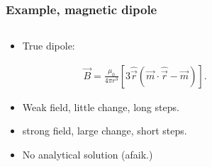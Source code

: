 \documentclass{beamer}
\begin{document}
\begin{frame}
\frametitle{Example, magnetic dipole}

\begin{columns}
\begin{column}{0.5\linewidth}
\begin{itemize}

\item <1-> True dipole:

\begin{align*}
\vec{B} = \frac{\mu_0}{4\pi r^3} \left[3 \hat{\vec{r}}(\vec{m}\cdot\hat{\vec{r}} -\vec{m}) \right].
\end{align*}

\item <2-> Weak field, little change, long steps.

\item <3-> strong field, large change, short steps.

\item <4-> No analytical solution (afaik.)


\end{itemize}
\end{column}
\begin{column}{0.5\linewidth}


%
\end{column}
\end{columns}
\end{frame}
\end{document}

